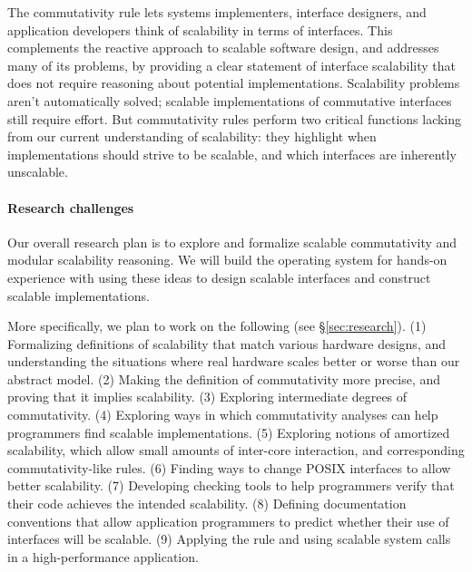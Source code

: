 The commutativity rule lets systems implementers, interface
designers, and application developers think of scalability in terms of
interfaces.
%
This complements the reactive approach to scalable software design, and
addresses many of its problems, by providing a clear statement of
interface scalability that does not require reasoning about
potential implementations.
%
Scalability problems aren't automatically solved;
%
scalable implementations of commutative interfaces still require effort.
%
But commutativity rules perform two critical functions
lacking from our current understanding of scalability: they highlight
when implementations should strive to be scalable, and which interfaces
are inherently unscalable.



\paragraph{Research challenges}

Our overall research plan is to explore and formalize scalable
commutativity and modular scalability reasoning. We will build
the {\sys} operating system for hands-on experience with
using these ideas to design scalable interfaces and 
construct scalable implementations.

More specifically, we plan to work on the following (see
\S\ref{sec:research}).
(1) Formalizing definitions of scalability that match various
hardware designs, and understanding the situations where real
hardware scales better or worse than our abstract model.
(2) Making the definition of commutativity more precise,
and proving that it implies scalability.
(3) Exploring intermediate degrees of commutativity.
(4) Exploring ways in which commutativity analyses can help
programmers find scalable implementations.
(5) Exploring notions of amortized scalability, which allow
small amounts of inter-core interaction, and corresponding
commutativity-like rules.
(6) Finding ways to change POSIX interfaces to allow better
scalability.
(7) Developing checking tools to help programmers verify that
their code achieves the intended scalability.
(8) Defining documentation conventions that allow application
programmers to predict whether their use of interfaces will
be scalable.
(9) Applying the rule and using scalable system calls in a
high-performance application.
